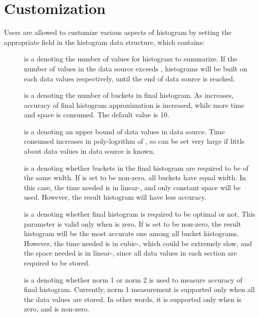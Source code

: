 \section{Customization}
\label{sec:histograms-customization}
Users are allowed to customize various aspects of histogram by 
setting the appropriate field in the histogram data structure, 
which contains: 

\begin{description}
\item[] is a  denoting the number of values
  for histogram to summarize. If the number of values in the data
  source exceeds , histograms will be built on each
   data values respectively, until the end of data
  source is reached. 

\item[] is a  denoting the number of buckets
  in final histogram. As  increases, accuracy of final
  histogram approximation is increased, while more time and space is
  consumed. The default value is 10.

\item[] is a  denoting an upper bound of data
  values in data source. Time consumed increases in poly-logrithm of
  , so  can be set very large if little about
  data values in data source is known. 

\item[] is a  denoting whether buckets in the final
  histogram are required to be of the same width. If  is
  set to be non-zero, all buckets have equal width. In this case,
  the time needed is in linear-, and only constant space will
  be used. However, the result histogram will have less accuracy. 

\item[] is a  denoting whether final histogram
  is required to be optimal or not. This parameter is valid only
  when  is zero. If  is set to be
  non-zero, the result histogram will be the most accurate one among
  all  bucket histograms. However, the time needed is in
  cubic-, which could be extremely slow, and the space
  needed is in linear-, since all data values in each
   section are required to be stored.

\item[] is a  denoting whether norm 1 or norm 2
  is used to measure accuracy of final histogram. Currently, norm 1
  measurement is supported only when all the data values are
  stored. In other words, it is supported only when  is
  zero, and  is non-zero. 


\end{description}
